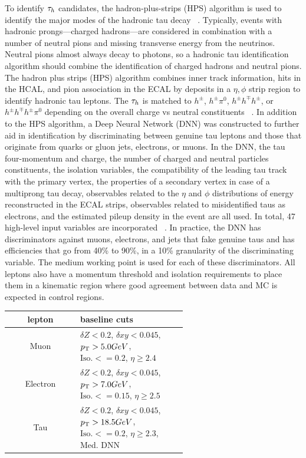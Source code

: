 To identify $\tau_h$ candidates, the hadron-plus-strips (HPS) algorithm is used to identify the major modes of the hadronic tau decay ~\cite{Sirunyan_2018}. Typically, events with hadronic prongs---charged hadrons---are considered in combination with a number of neutral pions and missing transverse energy from the neutrinos. Neutral pions almost always decay to photons, so a hadronic tau identification algorithm should combine the identification of charged hadrons and neutral pions. 
The hadron plus strips (HPS) algorithm combines inner track information, hits in the HCAL, and pion association in the ECAL by deposits in a $\eta,\phi$ strip region to identify hadronic tau leptons. 
The $\tau_h$ is matched to $h^{\pm}$, $h^{\pm}\pi^{0}$, $h^{\pm}h^{\mp}h^{\pm}$, or $h^{\pm}h^{\mp}h^{\pm}\pi^{0}$ depending on the overall charge vs neutral constituents ~\cite{Sirunyan:2018pgf,Hassanshahi:2797703}.
In addition to the HPS algorithm, a Deep Neural Network (DNN) was constructed to further aid in identification by discriminating between genuine tau leptons and those that originate from quarks or gluon jets, electrons, or muons.  
In the DNN, the tau four-momentum and charge,
the number of charged and neutral particles constituents,
the isolation variables,
the compatibility of the leading tau track with the primary vertex,
the properties of a secondary vertex in case of a multiprong tau decay,
observables related to the $\eta$ and $\phi$ distributions of energy reconstructed in the ECAL strips,
observables related to misidentified taus as electrons, 
and the estimated pileup density in the event are all used. In total, 47 high-level input variables are incorporated 
~\cite{https://doi.org/10.48550/arxiv.2201.08458}.
In practice, the DNN has discriminators against muons, electrons, and jets that fake genuine taus and has efficiencies that go from 40\% to 90\%, in a 10\% granularity of the discriminating variable. The medium working point is used for each of these discriminators. 
All leptons also have a momentum threshold and isolation requirements to place them in a kinematic region where good agreement between data and MC is expected in control regions.  

\begin{table}[h!tbp]
\centering
{}
\begin{tabular*}{0.8\textwidth}{c|p{0.6\linewidth}}
\hline
lepton          & baseline cuts \\\hline 
Muon            & $\delta Z < 0.2$, $\delta xy < 0.045$, $p_{\mathrm{T}} > 5.0 GeV$, $\text{Iso.} <= 0.2$, $\eta \geq 2.4$\\\hline
Electron        & $\delta Z < 0.2$, $\delta xy < 0.045$, $p_{\mathrm{T}} > 7.0 GeV$, $\text{Iso.} <= 0.15$, $\eta \geq 2.5$ \\\hline
Tau             & $\delta Z < 0.2$, $\delta xy < 0.045$, $p_{\mathrm{T}} > 18.5 GeV$, $\text{Iso.} <= 0.2$, $\eta \geq 2.3$, Med. DNN \\\hline
\end{tabular*}
\end{table}


